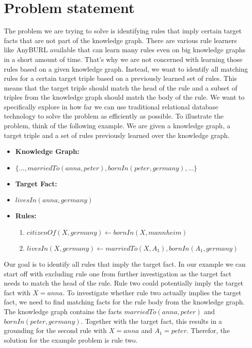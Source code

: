 \documentclass[runningheads]{llncs}
\begin{document}
\section{Problem statement}
The problem we are trying to solve is identifying rules that imply certain target facts that are not part of the knowledge graph. There are various rule learners like AnyBURL available that can learn many rules even on big knowledge graphs in a short amount of time. That’s why we are not concerned with learning those rules based on a given knowledge graph. Instead, we want to identify all matching rules for a certain target triple based on a previously learned set of rules. This means that the target triple should match the head of the rule and a subset of triples from the knowledge graph should match the body of the rule. We want to specifically explore in how far we can use traditional relational database technology to solve the problem as efficiently as possible. To illustrate the problem, think of the following example. We are given a knowledge graph, a target triple and a set of rules previously learned over the knowledge graph.

\begin{itemize}
  \item \textbf{Knowledge Graph:}
  \item[] \(\{…, marriedTo(anna, peter), bornIn(peter, germany), …\}\)
  \item \textbf{Target Fact:}
  \item[] \(livesIn(anna, germany)\)
  \item \textbf{Rules:}
  \begin{enumerate}
      \item \(citizenOf(X, germany) \leftarrow bornIn(X, mannheim)\)
      \item \(livesIn(X, germany) \leftarrow marriedTo(X, A_1), bornIn(A_1, germany)\)
  \end{enumerate}
\end{itemize}

Our goal is to identify all rules that imply the target fact. In our example we can start off with excluding rule one from further investigation as the target fact needs to match the head of the rule. Rule two could potentially imply the target fact with \(X = anna\). To investigate whether rule two actually implies the target fact, we need to find matching facts for the rule body from the knowledge graph. The knowledge graph contains the facts \(marriedTo(anna, peter)\) and \(bornIn(peter, germany)\). Together with the target fact, this results in a grounding for the second rule with \(X = anna\) and \(A_1 = peter\). Therefor, the solution for the example problem is rule two.
\end{document}

